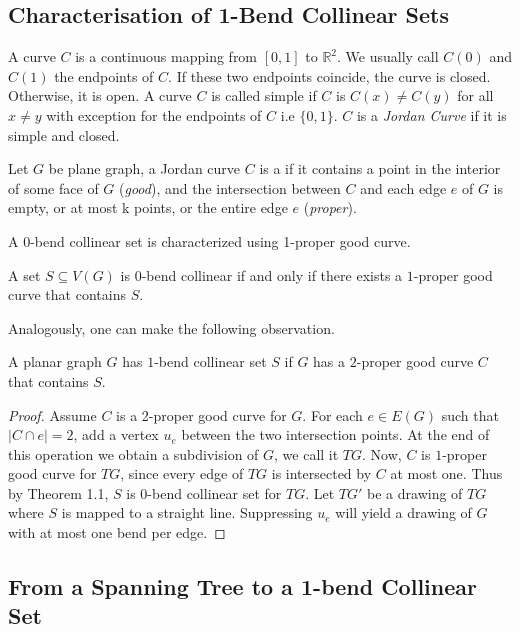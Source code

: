 \subsection{Characterisation of 1-Bend Collinear Sets}
A curve $C$ is a continuous mapping from $[0, 1]$ to $\mathbb{R}^2$. We usually call $C(0)$ and $C(1)$ the endpoints of $C$. If these two endpoints coincide, the curve is closed. Otherwise, it is open. A curve $C$ is called simple if $C$ is $C(x) \neq C(y)$ for all $x \neq y$ with exception for the endpoints of $C$ i.e $\{0, 1\}$. $C$ is a \textit{Jordan Curve} if it is simple and closed.

Let $G$ be plane graph, a Jordan curve $C$ is a  if it contains a point in the interior of some face of $G$ (\textit{good}), and the intersection between $C$ and each edge $e$ of $G$ is empty, or at most k points, or the entire edge $e$ (\textit{proper}).

A $0$-bend collinear set is characterized using 1-proper good curve.

\begin{thm}
A set $S \subseteq V(G)$ is 0-bend collinear if and only if there exists a $1$-proper good curve that contains $S$.
\end{thm}

Analogously, one can make the following observation.
\begin{observation} {\label{new_topo}}
    A planar graph $G$ has $1$-bend collinear set $S$ if $G$ has a $2$-proper good curve $C$ that contains $S$.
\end{observation}
\begin{proof}
Assume $C$ is a 2-proper good curve for $G$. For each $e \in E(G)$ such that $|C \cap e| = 2$, add a vertex $u_e$ between the two intersection points. At the end of this operation we obtain a subdivision of $G$, we call it $TG$. Now, $C$ is $1$-proper good curve for $TG$, since every edge of $TG$ is intersected by $C$ at most one. Thus by Theorem 1.1, $S$ is 0-bend collinear set for $TG$. Let $TG'$ be a drawing of $TG$ where $S$ is mapped to a straight line. Suppressing $u_e$ will yield a drawing of $G$ with at most one bend per edge.
\end{proof}

\subsection{From a Spanning Tree to a 1-bend Collinear Set}


